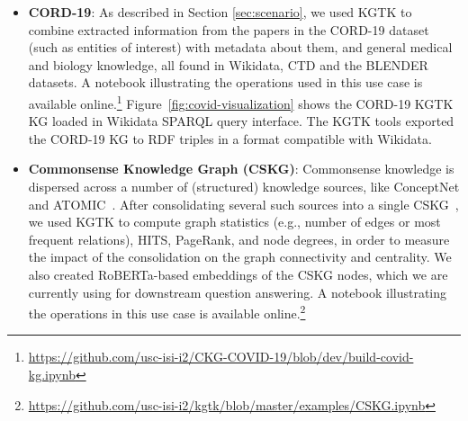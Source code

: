 \documentclass[runningheads]{llncs}
\newcommand{\kibitz}[2]{%
{\color{#1}#2}{}%
}
\newcommand{\DG}[1]{\kibitz{red}{[DG: #1]}} %
\begin{document}
\begin{itemize}
    \item \textbf{CORD-19}: As described in Section \ref{sec:scenario}, we used KGTK to combine extracted information from the papers in the CORD-19 dataset (such as entities of interest) with metadata about them, and general medical and biology knowledge, all found in Wikidata, CTD and the BLENDER datasets. A notebook illustrating the operations used in this use case is available online.\footnote{\url{https://github.com/usc-isi-i2/CKG-COVID-19/blob/dev/build-covid-kg.ipynb}} %
    Figure~\ref{fig:covid-visualization} shows the CORD-19 KGTK KG loaded in Wikidata SPARQL query interface. The KGTK tools exported the CORD-19 KG to RDF triples in a format compatible with Wikidata. 

\item \textbf{Commonsense Knowledge Graph (CSKG)}: Commonsense knowledge is dispersed across a number of (structured) knowledge sources, like ConceptNet and ATOMIC~\cite{sap2019atomic}. After consolidating several such sources into a single CSKG~\cite{ilievski2020consolidating}, we used KGTK to compute graph statistics (e.g., number of edges or most frequent relations), HITS, PageRank, and node degrees, in order to measure the impact of the consolidation on the graph connectivity and centrality. We also created RoBERTa-based embeddings of the CSKG nodes, which we are currently using for downstream question answering. A notebook illustrating the operations in this use case is available online.\footnote{\url{https://github.com/usc-isi-i2/kgtk/blob/master/examples/CSKG.ipynb}} 


\end{itemize}
\end{document}
